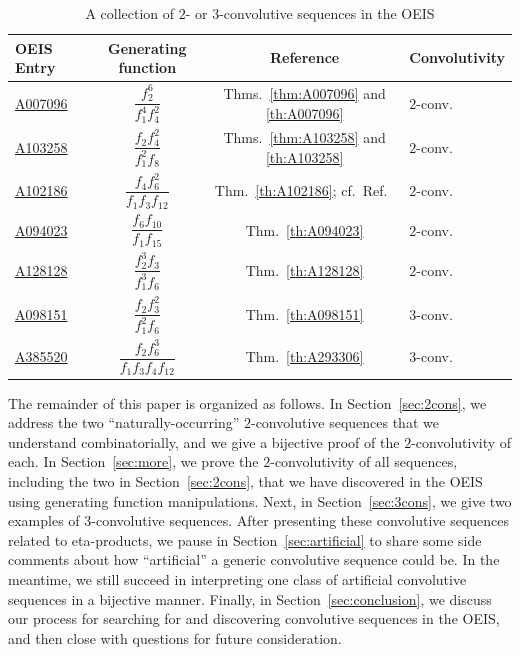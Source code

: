 \documentclass[12pt,reqno]{amsart}
\numberwithin{equation}{section}
\theoremstyle{plain}
\theoremstyle{definition}
\theoremstyle{named}
\begin{document}
\begin{table}[ht]
	
	\renewcommand{\arraystretch}{2.4} 
	\caption{A collection of $2$- or $3$-convolutive sequences in the OEIS}\label{tab:list}
	\begin{center}
		\begin{tabularx}{\textwidth}{@{}>{\centering\arraybackslash}X|c|c|>{\centering\arraybackslash}X@{}} 
			\hline
			OEIS Entry & Generating function & Reference & Convolutivity\\
			\hline
			\href{https://oeis.org/A007096}{A007096} & $\dfrac{f_2^6}{f_1^4f_4^2}$ & Thms.~\ref{thm:A007096} and \ref{th:A007096} & $2$-conv.\\
			\href{https://oeis.org/A103258}{A103258} & $\dfrac{f_2f_4^2}{f_1^2f_8}$ & Thms.~\ref{thm:A103258} and \ref{th:A103258} & $2$-conv.\\
			\href{https://oeis.org/A102186}{A102186} & $\dfrac{f_4f_6^2}{f_1f_3f_{12}}$ & Thm.~\ref{th:A102186}; cf.~Ref.~\cite{ALL2002} & $2$-conv.\\
			\href{https://oeis.org/A094023}{A094023} & $\dfrac{f_6f_{10}}{f_1f_{15}}$ & Thm.~\ref{th:A094023} & $2$-conv.\\
			\href{https://oeis.org/A128128}{A128128} & $\dfrac{f_2^3f_{3}}{f_1^3f_{6}}$ & Thm.~\ref{th:A128128} & $2$-conv.\\
			\href{https://oeis.org/A098151}{A098151} & $\dfrac{f_2f_3^2}{f_1^2f_6}$ & Thm.~\ref{th:A098151} & $3$-conv.\\
			\href{https://oeis.org/A385520}{A385520} & $\dfrac{f_2f_6^3}{f_1f_3f_4f_{12}}$ & Thm.~\ref{th:A293306} & $3$-conv.\\[10pt]
			\hline
		\end{tabularx}
	\end{center}
\end{table}

The remainder of this paper is organized as follows. In Section~\ref{sec:2cons}, we address the two ``naturally-occurring'' $2$-convolutive sequences that we understand combinatorially, and we give a bijective proof of the $2$-convolutivity of each. In Section~\ref{sec:more}, we prove the $2$-convolutivity of all sequences, including the two in Section~\ref{sec:2cons}, that we have discovered in the OEIS using generating function manipulations. Next, in Section~\ref{sec:3cons}, we give two examples of $3$-convolutive sequences. After presenting these convolutive sequences related to eta-products, we pause in Section~\ref{sec:artificial} to share some side comments about how ``artificial'' a generic convolutive sequence could be. In the meantime, we still succeed in interpreting one class of artificial convolutive sequences in a bijective manner. Finally, in Section~\ref{sec:conclusion}, we discuss our process for searching for and discovering convolutive sequences in the OEIS, and then close with questions for future consideration.
\end{document}
